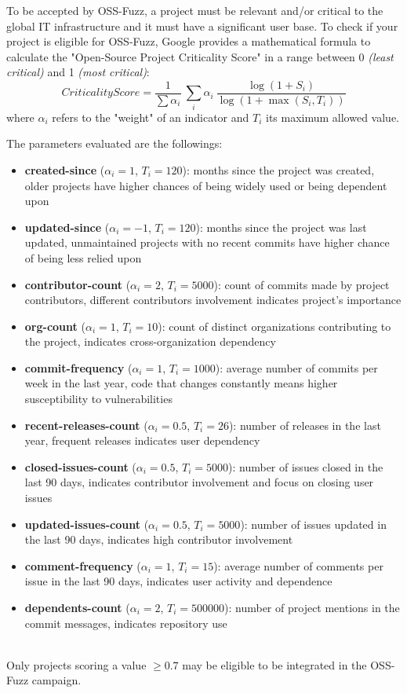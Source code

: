 To be accepted by OSS-Fuzz, a project must be relevant and/or critical to the global IT infrastructure and it must have a significant user base.
To check if your project is eligible for OSS-Fuzz, Google provides a mathematical formula to calculate the "Open-Source Project Criticality Score" \cite{score} in a range between 0 \textit{(least critical)} and 1 \textit{(most critical)}:
\ \\ 

\begin{equation}
    CriticalityScore = \frac{1}{\sum \alpha_i}\  \sum_i \alpha_i \ \frac{\log(1+S_i)}{\log(1+\max(S_i,T_i))}
\end{equation}
where $\alpha_i$ refers to the "weight" of an indicator and $T_i$ its maximum allowed value.

The parameters evaluated are the followings:
\begin{itemize}
    \item \textbf{created-since} ($\alpha_i = 1$, $T_i = 120$): months since the project was created, older projects have higher chances of being widely used or being dependent upon
    \item \textbf{updated-since} ($\alpha_i = -1$, $T_i = 120$): months since the project was last updated, unmaintained projects with no recent commits have higher chance of being less relied upon
    \item \textbf{contributor-count} ($\alpha_i = 2$, $T_i = 5000$): count of commits made by project contributors, different contributors involvement indicates project's importance
    \item \textbf{org-count} ($\alpha_i = 1$, $T_i = 10$): count of distinct organizations contributing to the project, indicates cross-organization dependency
    \item \textbf{commit-frequency} ($\alpha_i = 1$, $T_i = 1000$): average number of commits per week in the last year, code that changes constantly means higher susceptibility to vulnerabilities
    \item \textbf{recent-releases-count} ($\alpha_i = 0.5$, $T_i = 26$): number of releases in the last year, frequent releases indicates user dependency
    \item \textbf{closed-issues-count} ($\alpha_i = 0.5$, $T_i = 5000$): number of issues closed in the last 90 days, indicates contributor involvement and focus on closing user issues
    \item \textbf{updated-issues-count} ($\alpha_i = 0.5$, $T_i = 5000$): number of issues updated in the last 90 days, indicates high contributor involvement
    \item \textbf{comment-frequency} ($\alpha_i = 1$, $T_i = 15$): average number of comments per issue in the last 90 days, indicates  user activity and dependence
    \item \textbf{dependents-count} ($\alpha_i = 2$, $T_i = 500000$): number of project mentions in the commit messages, indicates repository use
\end{itemize}
\ \\
Only projects scoring a value $\geq 0.7$ may be eligible to be integrated in the OSS-Fuzz campaign.


